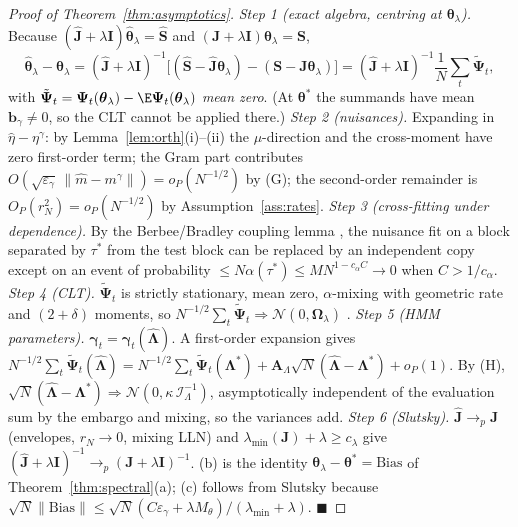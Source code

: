 \begin{proof}[Proof of Theorem~\ref{thm:asymptotics}]
\emph{Step 1 (exact algebra, centring at $\boldsymbol\theta_\lambda$).} Because $(\hat{\boldsymbol J}+\lambda\boldsymbol I)\hat{\boldsymbol\theta}_\lambda=\hat{\boldsymbol S}$ and $(\boldsymbol J+\lambda\boldsymbol I)\boldsymbol\theta_\lambda=\boldsymbol S$,
\[
\hat{\boldsymbol\theta}_\lambda-\boldsymbol\theta_\lambda=(\hat{\boldsymbol J}+\lambda\boldsymbol I)^{-1}\Big[(\hat{\boldsymbol S}-\hat{\boldsymbol J}\boldsymbol\theta_\lambda)-(\boldsymbol S-\boldsymbol J\boldsymbol\theta_\lambda)\Big]
=(\hat{\boldsymbol J}+\lambda\boldsymbol I)^{-1}\frac1N\sum_t\tilde{\boldsymbol\Psi}_t,
\]
with $\tilde{\boldsymbol\Psi}_t=\boldsymbol\Psi_t(\boldsymbol\theta_\lambda)-\E\boldsymbol\Psi_t(\boldsymbol\theta_\lambda)$ \emph{mean zero}. (At $\boldsymbol\theta^*$ the summands have mean $\boldsymbol b_\gamma\neq0$, so the CLT cannot be applied there.)
\emph{Step 2 (nuisances).} Expanding in $\hat\eta-\eta^\gamma$: by Lemma~\ref{lem:orth}(i)--(ii) the $\mu$-direction and the cross-moment have zero first-order term; the Gram part contributes $O(\sqrt{\varepsilon_\gamma}\,\|\hat m-m^\gamma\|)=o_P(N^{-1/2})$ by (G); the second-order remainder is $O_P(r_N^2)=o_P(N^{-1/2})$ by Assumption~\ref{ass:rates}.
\emph{Step 3 (cross-fitting under dependence).} By the Berbee/Bradley coupling lemma \citep{bradley2005basic}, the nuisance fit on a block separated by $\tau^*$ from the test block can be replaced by an independent copy except on an event of probability $\le N\alpha(\tau^*)\le MN^{1-c_\alpha C}\to0$ when $C>1/c_\alpha$.
\emph{Step 4 (CLT).} $\tilde{\boldsymbol\Psi}_t$ is strictly stationary, mean zero, $\alpha$-mixing with geometric rate and $(2{+}\delta)$ moments, so $N^{-1/2}\sum_t\tilde{\boldsymbol\Psi}_t\Rightarrow\mathcal N(0,\boldsymbol\Omega_\lambda)$ \citep{ibragimov1962some}.
\emph{Step 5 (HMM parameters).} $\boldsymbol\gamma_t=\boldsymbol\gamma_t(\hat{\boldsymbol\Lambda})$. A first-order expansion gives $N^{-1/2}\sum_t\tilde{\boldsymbol\Psi}_t(\hat{\boldsymbol\Lambda})=N^{-1/2}\sum_t\tilde{\boldsymbol\Psi}_t(\boldsymbol\Lambda^*)+\boldsymbol A_\Lambda\sqrt N(\hat{\boldsymbol\Lambda}-\boldsymbol\Lambda^*)+o_P(1)$.
By (H), $\sqrt N(\hat{\boldsymbol\Lambda}-\boldsymbol\Lambda^*)\Rightarrow\mathcal N(0,\kappa\,\mathcal I_\Lambda^{-1})$, asymptotically independent of the evaluation sum by the embargo and mixing, so the variances add.
\emph{Step 6 (Slutsky).} $\hat{\boldsymbol J}\to_p\boldsymbol J$ (envelopes, $r_N\to0$, mixing LLN) and $\lambda_{\min}(\boldsymbol J)+\lambda\ge c_\lambda$ give $(\hat{\boldsymbol J}+\lambda\boldsymbol I)^{-1}\to_p(\boldsymbol J+\lambda\boldsymbol I)^{-1}$. (b) is the identity $\boldsymbol\theta_\lambda-\boldsymbol\theta^*=\mathrm{Bias}$ of Theorem~\ref{thm:spectral}(a); (c) follows from Slutsky because $\sqrt N\|\mathrm{Bias}\|\le\sqrt N(C\varepsilon_\gamma+\lambda M_\theta)/(\lambda_{\min}+\lambda)$. $\blacksquare$
\end{proof}

